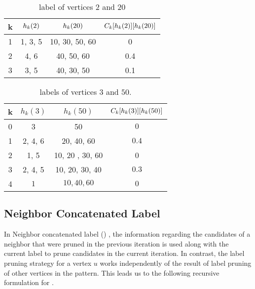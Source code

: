 \begin{table}[h]
    \centering
    \begin{tabular}{|c|c|c|c|}
        \hline
        k & $h_{k}(2)$ & $h_{k}(20)$ & $C_{k}[h_{k}(2)][h_{k}(20)]$\\
        \hline
        1 & 1, 3, 5 & 10, 30, 50, 60 & 0 \\
        2 & 4, 6 & 40, 50, 60 & 0.4 \\
        3 & 3, 5 & 40, 30, 50 & 0.1\\
        \hline
    \end{tabular}
    \caption{\khop label of vertices $2$ and $20$}
    \label{tab:khop220}
\end{table}

\begin{table}[h]
    \centering
    \begin{tabular}{|c|c|c|c|}
        \hline
        k & $h_k(3)$ & $h_k(50)$ & $C_{k}[h_{k}(3)][h_{k}(50)]$ \\
        \hline
        0 & 3 & 50 & $0$\\
        1 & 2, 4, 6 & 20, 40, 60 & $0.4$ \\
        2 & 1, 5 & 10, 20 , 30, 60 & 0\\
        3 & 2, 4, 5 & 10, 20, 30, 40 & $0.3$ \\
        4 & $1$ & $10, 40, 60$ & $0$ \\
        \hline
    \end{tabular}
    \caption{\khop labels of vertices $3$ and $50$.}
    \label{tab:khop350}
\end{table}



\subsection{Neighbor Concatenated Label} In Neighbor concatenated label (\ncl) ,
the information regarding the candidates of a neighbor that were pruned in the
previous iteration is used along with the current \khop label to prune
candidates in the current iteration. In contrast, the \khop label pruning
strategy for a vertex $u$ works independently of the result of \khop label
pruning of other vertices in the pattern. This leads us to the following
recursive formulation for \ncl.

